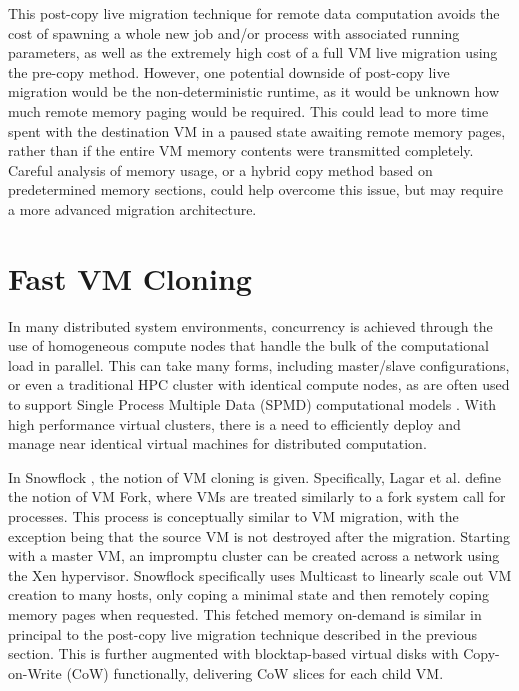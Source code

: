 This post-copy live migration technique for remote data computation avoids the cost of spawning a whole new job and/or process with associated running parameters, as well as the extremely high cost of a full VM live migration using the pre-copy method. However, one potential downside of post-copy live migration would be the non-deterministic runtime, as it would be unknown how much remote memory paging would be required. This could lead to more time spent with the destination VM in a paused state awaiting remote memory pages, rather than if the entire VM memory contents were transmitted completely. Careful analysis of memory usage, or a hybrid copy method based on predetermined memory sections, could help overcome this issue, but may require a more advanced migration architecture. 






\section{Fast VM Cloning}
\label{vmcloning}

In many distributed system environments, concurrency is achieved through the use of homogeneous compute nodes that handle the bulk of the computational load in parallel. This can take many forms, including master/slave configurations, or even a traditional HPC cluster with identical compute nodes, as are often used to support Single Process Multiple Data (SPMD) computational models \cite{spmd1988}. With high performance virtual clusters, there is a need to efficiently deploy and manage near identical virtual machines for distributed computation. 

In Snowflock \cite{lagar2009snowflock, lagar2011snowflock}, the notion of VM cloning is given. Specifically, Lagar et al. define the notion of VM Fork, where VMs are treated similarly to a fork\(\) system call for processes.   This process is conceptually similar to VM migration, with the exception being that the source VM is not destroyed after the migration. Starting with a master VM, an impromptu cluster can be created across a network using the Xen hypervisor.  Snowflock specifically uses Multicast to linearly scale out VM creation to many hosts, only coping a minimal state and then remotely coping memory pages when requested.  This fetched memory on-demand is similar in principal to the post-copy live migration technique described in the previous section.  This is further augmented with blocktap-based virtual disks with Copy-on-Write (CoW) functionally, delivering CoW slices for each child VM. 

